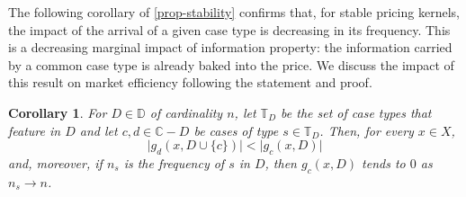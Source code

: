 \documentclass[ecta,nameyear,draft]{econsocart}
\newcommand{\bs}{-}%
\newcommand{\mbbd}{{\mathds D}}
\newcommand{\mbbc}{{\mathds C}}
\newcommand{\mbbt}{{\mathds {T}}}
\theoremstyle{plain}
\newtheorem{corollary}{Corollary}[theorem]
\theoremstyle{remark}
\begin{document}
The following corollary of \cref{prop-stability} confirms that, for stable
pricing kernels, the impact of the arrival of a given case type is decreasing
in its frequency.  This is a decreasing marginal impact of information
property: the information carried by a common case type is already baked into
the price.  We discuss the impact of this result on market efficiency following
the statement and proof.
\begin{corollary}\label{cor-efficiency}
  For $D \in \mbbd$ of cardinality $n$, let $\mbbt_D$ be the set of case types
  that feature in $D$ and let $c, d \in \mbbc \bs D$ be cases of type $s \in
  \mbbt_D$. %
  Then, for every $x \in X$,
  \begin{equation*}
    \lvert g_{d}(x, D\cup \{c\}) \rvert < \lvert g_c(x, D)\rvert
  \end{equation*}
  and, moreover, if $n_s$ is the frequency of $s$ in $D$, then $g_c(x, D)$
  tends to $0$ as $n_s \rightarrow n$. 
\end{corollary}
\end{document}
